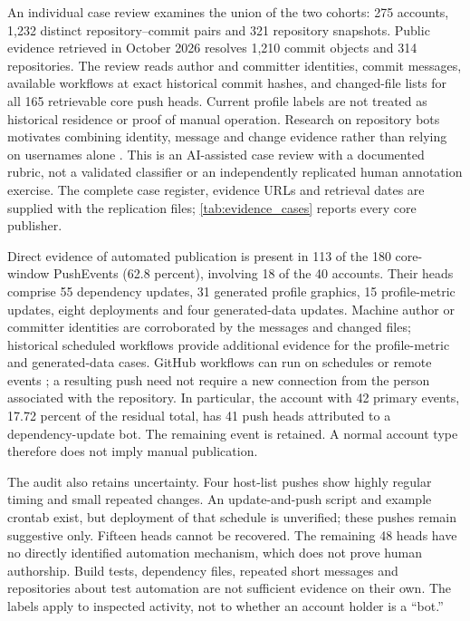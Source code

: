 An individual case review examines the union of the two cohorts: 275 accounts, 1,232 distinct repository--commit pairs and 321 repository snapshots. Public evidence retrieved in October 2026 resolves 1,210 commit objects and 314 repositories. The review reads author and committer identities, commit messages, available workflows at exact historical commit hashes, and changed-file lists for all 165 retrievable core push heads. Current profile labels are not treated as historical residence or proof of manual operation. Research on repository bots motivates combining identity, message and change evidence rather than relying on usernames alone \citep{dey2020bots,golzadeh2021bots}. This is an AI-assisted case review with a documented rubric, not a validated classifier or an independently replicated human annotation exercise. The complete case register, evidence URLs and retrieval dates are supplied with the replication files; \cref{tab:evidence_cases} reports every core publisher.

Direct evidence of automated publication is present in 113 of the 180 core-window PushEvents (62.8 percent), involving 18 of the 40 accounts. Their heads comprise 55 dependency updates, 31 generated profile graphics, 15 profile-metric updates, eight deployments and four generated-data updates. Machine author or committer identities are corroborated by the messages and changed files; historical scheduled workflows provide additional evidence for the profile-metric and generated-data cases. GitHub workflows can run on schedules or remote events \citep{githubactions}; a resulting push need not require a new connection from the person associated with the repository. In particular, the account with 42 primary events, 17.72 percent of the residual total, has 41 push heads attributed to a dependency-update bot. The remaining event is retained. A normal account type therefore does not imply manual publication.

The audit also retains uncertainty. Four host-list pushes show highly regular timing and small repeated changes. An update-and-push script and example crontab exist, but deployment of that schedule is unverified; these pushes remain suggestive only. Fifteen heads cannot be recovered. The remaining 48 heads have no directly identified automation mechanism, which does not prove human authorship. Build tests, dependency files, repeated short messages and repositories about test automation are not sufficient evidence on their own. The labels apply to inspected activity, not to whether an account holder is a ``bot.''

